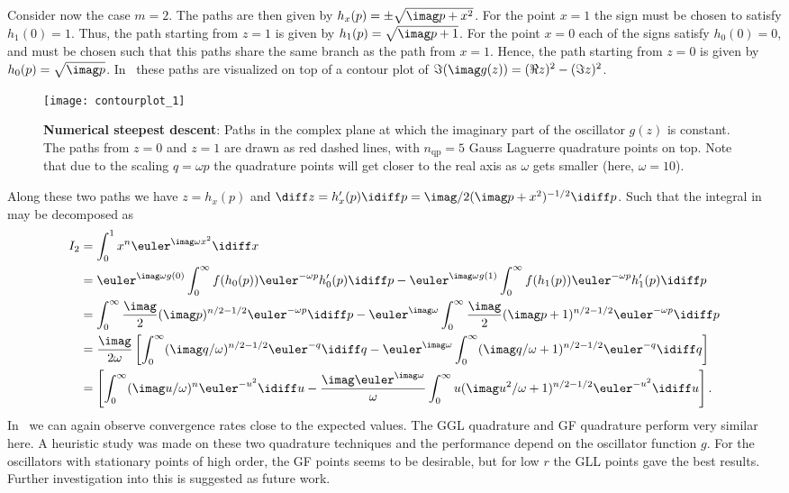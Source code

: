 Consider now the case $m=2$. The paths are then given by $h_x(p) = \pm\sqrt{\imag p + x^2}$. For the point $x=1$ the sign must be chosen to satisfy $h_1(0) = 1$. Thus, the path starting from $z=1$ is given by $h_1(p) = \sqrt{\imag p + 1}$. For the point $x=0$ each of the signs satisfy $h_0(0) = 0$, and must be chosen such that this paths share the same branch as the path from $x=1$. Hence, the path starting from $z=0$ is given by $h_0(p) = \sqrt{\imag p}$. In~ these paths are visualized on top of a contour plot of $\Im(\imag g(z)) = (\Re z)^2-(\Im z)^2$.
\begin{figure}
	\centering
	\texttt{[image: contourplot\_1]}
	\caption{\textbf{Numerical steepest descent}: Paths in the complex plane at which the imaginary part of the oscillator $g(z)$ is constant. The paths from $z=0$ and $z=1$ are drawn as red dashed lines, with $n_{\mathrm{qp}}=5$ Gauss Laguerre quadrature points on top. Note that due to the scaling $q=\omega p$ the quadrature points will get closer to the real axis as $\omega$ gets smaller (here, $\omega=10$).}
	\label{Fig4:paths}
\end{figure}
Along these two paths we have $z=h_x(p)$ and $\diff z=h_x'(p)\idiff p=\imag/2(\imag p+x^2)^{-1/2}\idiff p$. Such that the integral in~ may be decomposed as
\begin{align*}
	I_2 &= \int_0^1 x^n \euler^{\imag \omega x^2}\idiff x \\
	  &= \euler^{\imag\omega g(0)}\int_0^\infty f(h_0(p))\euler^{-\omega p}h_0'(p)\idiff p - \euler^{\imag\omega g(1)}\int_0^\infty f(h_1(p))\euler^{-\omega p}h_1'(p)\idiff p\\
	  &= \int_0^\infty \frac{\imag}{2}(\imag p)^{n/2-1/2}\euler^{-\omega p}\idiff p - \euler^{\imag\omega}\int_0^\infty \frac{\imag}{2}(\imag p+1)^{n/2-1/2}\euler^{-\omega p}\idiff p\\
	  &= \frac{\imag}{2\omega}\left[\int_0^\infty (\imag q/\omega)^{n/2-1/2}\euler^{-q}\idiff q - \euler^{\imag\omega}\int_0^\infty (\imag q/\omega+1)^{n/2-1/2}\euler^{-q}\idiff q\right]\\
	  &= \left[\int_0^\infty (\imag u/\omega)^n\euler^{-u^2}\idiff u - \frac{\imag\euler^{\imag\omega}}{\omega}\int_0^\infty u(\imag u^2/\omega+1)^{n/2-1/2}\euler^{-u^2}\idiff u\right].
\end{align*}
In~ we can again observe convergence rates close to the expected values. The GGL quadrature and GF quadrature perform very similar here. A heuristic study was made on these two quadrature techniques and the performance depend on the oscillator function $g$. For the oscillators with stationary points of high order, the GF points seems to be desirable, but for low $r$ the GLL points gave the best results. Further investigation into this is suggested as future work.
